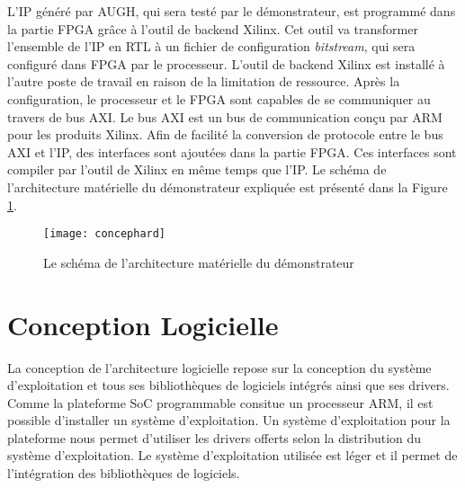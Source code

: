 L'IP généré par AUGH, qui sera testé par le démonstrateur, est programmé dans la partie FPGA grâce à l'outil de backend Xilinx.
Cet outil va transformer l'ensemble de l'IP en RTL à un fichier de configuration \emph{bitstream}, qui sera
configuré dans FPGA par le processeur. L'outil de backend Xilinx est installé à l'autre poste de travail en raison de la limitation de ressource.
Après la configuration, le processeur et le FPGA sont capables de se communiquer au travers de bus AXI. 
Le bus AXI est un bus de communication conçu par ARM pour les produits Xilinx. Afin de facilité la conversion de protocole
entre le bus AXI et l'IP, des interfaces sont ajoutées dans la partie FPGA. Ces interfaces sont compiler par l'outil de Xilinx
en même temps que l'IP.
Le schéma de l'architecture matérielle du démonstrateur expliquée est présenté
dans la Figure \ref{fig:concephard}.

\begin{figure}[h]
	\centering
	\texttt{[image: concephard]}
	\caption{Le schéma de l'architecture matérielle du démonstrateur}
	\label{fig:concephard}
	\vspace{-2mm}
\end{figure}

\section{Conception Logicielle}
\label{sec:concepsoft}

La conception de l'architecture logicielle repose sur la conception du système d'exploitation et tous ses
bibliothèques de logiciels intégrés ainsi que ses drivers. 
Comme la plateforme SoC programmable consitue un processeur ARM, il est possible d'installer un système d'exploitation.
Un système d'exploitation pour la plateforme nous permet d'utiliser les drivers offerts selon la distribution du système d'exploitation. Le système d'exploitation
utilisée est léger et il permet de l'intégration des bibliothèques de logiciels.

